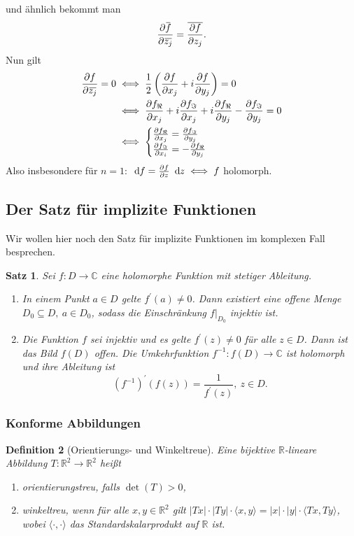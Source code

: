 \documentclass[a4paper,12pt]{article}
\theoremstyle{newthm}
\newtheorem{thm}{Satz}[subsection]
\theoremstyle{newdef}
\newtheorem{defn}[thm]{Definition}
\theoremstyle{newrem}
\newcommand{\R}{\mathbb{R}}
\newcommand{\C}{\mathbb{C}}
\renewcommand{\d}{\ \operatorname{d}\hspace{-2px}}
\newcommand{\del}{\partial}
\newcommand{\bound}[2]{\left.#1\right|_{#2}}
\newcommand{\overbar}[1]{\mkern 1.5mu\overline{\mkern-1.5mu#1\mkern-1.5mu}\mkern 1.5mu}
\begin{document}
		und ähnlich bekommt man 
		$$ \frac{\del \overbar{f}}{\del \overbar{z_j}} = \overbar{\frac{\del f}{\del z_j}}. $$
		Nun gilt
		\begin{align*}
			\frac{\del f}{\del \overbar{z_j}} = 0 &\iff \frac{1}{2} \left( \frac{\del f}{\del x_j} + i\frac{\del f}{\del y_j} \right) = 0\\
			&\iff \frac{\del f_\Re}{\del x_j} + i\frac{\del f_\Im}{\del x_j} + i\frac{\del f_\Re}{\del y_j} - \frac{\del f_\Im}{\del y_j} = 0\\
			&\iff \begin{cases}
			\frac{\del f_\Re}{\del x_j} = \frac{\del f_\Im}{\del y_j}\\
			\frac{\del f_\Im}{\del x_i} = -\frac{\del f_\Re}{\del y_j}
			\end{cases}
		\end{align*}
		Also insbesondere für $n=1$: $ \d f = \frac{\del f}{\del z}\d z \iff f $ holomorph. 
			
	
	\subsection{Der Satz für implizite Funktionen}
		
		Wir wollen hier noch den Satz für implizite Funktionen im komplexen Fall besprechen.
		
		\begin{thm}
			Sei $ f: D \to \C $ eine holomorphe Funktion mit stetiger Ableitung.
			\begin{enumerate}[label={\alph*})]
				\item In einem Punkt $a \in D$ gelte $ f^\prime(a) \neq 0 $. Dann existiert eine offene Menge $ D_0 \subseteq D,\ a \in D_0 $, sodass die Einschränkung $ \bound{f}{D_0} $ injektiv ist.
				\item Die Funktion $f$ sei injektiv und es gelte $ f^\prime(z) \neq 0 $ für alle $z \in D$. Dann ist das Bild $f(D)$ offen. Die Umkehrfunktion $ f^{-1}: f(D) \to \C $ ist holomorph und ihre Ableitung ist 
				$$ \left(f^{-1}\right)^\prime (f(z)) = \frac{1}{f^\prime(z)},\ z \in D. $$
			\end{enumerate}
		\end{thm}
		
		\subsubsection*{Konforme Abbildungen}
		
		\begin{defn}[Orientierungs- und Winkeltreue]
			Eine bijektive $\R$-lineare Abbildung $ T: \R^2 \to \R^2 $ heißt
			\begin{enumerate}[label={\alph*})]
				\item \emph{orientierungstreu}, falls $\det(T)>0$,
				\item \emph{winkeltreu}, wenn für alle $x,y \in \R^2$ gilt $ |Tx|\cdot |Ty| \cdot \langle x,y\rangle = |x| \cdot |y|\cdot \langle Tx,Ty \rangle $, wobei $\langle\cdot ,\cdot \rangle$ das Standardskalarprodukt auf $\R$ ist.
			\end{enumerate}
		\end{defn}
		
\end{document}
